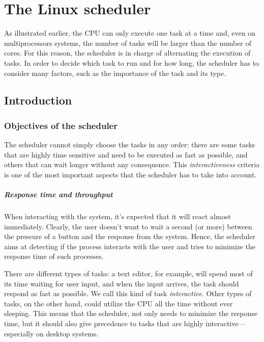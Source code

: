 \chapter{The Linux scheduler} %
\label{ch:sched}

As illustrated earlier, the CPU can only execute one task at a time and, even on multiprocessors systems, the number of tasks will be larger than the number of cores. For this reason, the scheduler is in charge of alternating the execution of tasks. 
In order to decide which task to run and for how long, the scheduler has to consider many factors, such as the importance of the task and its type.

\section{Introduction}%

\subsection{Objectives of the scheduler}

The scheduler cannot simply choose the tasks in any order: there are some tasks that are highly time sensitive and need to be executed as fast as possible, and others that can wait longer without any consequence. This \textit{interactiveness} criteria is one of the most important aspects that the scheduler has to take into account.

\paragraph{Response time and throughput}
When interacting with the system, it's expected that it will react almost
immediately. Clearly, the user doesn't want to wait a second (or more)
between the pressure of a button and the response from the
system. Hence, the scheduler aims at detecting if the process
interacts with the user and tries to minimize the response time of such
processes.

There are different types of tasks: a text editor, for example, will spend most of its time waiting for user input, and when the input arrives, the task should respond as fast as possible. We call this kind of task \textit{interactive}. Other types of tasks, on the other hand, could utilize the CPU all the time without ever sleeping. %
This means that the scheduler, not only needs to minimize the response time, but it should also give precedence to tasks that are highly interactive---especially on desktop systems.

